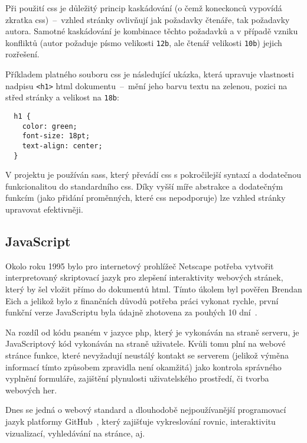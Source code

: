 \documentclass[a4paper, 12pt]{article}
\begin{document}
  Při použití \gls{css} je důležitý princip kaskádování (o čemž koneckonců vypovídá zkratka \gls{css})~--~vzhled stránky ovlivňují jak požadavky čtenáře, tak požadavky autora. Samotné kaskádování je kombinace těchto požadavků a v případě vzniku konfliktů (autor požaduje písmo velikosti \texttt{12b}, ale čtenář velikosti \texttt{10b}) jejich rozřešení.

  Příkladem platného souboru \gls{css} je následující ukázka, která upravuje vlastnosti nadpisu \texttt{<h1>} \gls{html} dokumentu~--~mění jeho barvu textu na zelenou, pozici na střed stránky a velikost na \texttt{18b}:

  \begin{verbatim}
  h1 {
    color: green;
    font-size: 18pt;
    text-align: center;
  }
  \end{verbatim}

  V projektu je používán \gls{sass}, který převádí \gls{css} s pokročilejší syntaxí a dodatečnou funkcionalitou do standardního \gls{css}. Díky vyšší míře abstrakce a dodatečným funkcím (jako přidání proměnných, které \gls{css} nepodporuje) lze vzhled stránky upravovat efektivněji.


  \subsection{JavaScript} \label{sec:JavaScript}
  Okolo roku 1995 bylo pro internetový prohlížeč Netscape potřeba vytvořit interpretovaný skriptovací jazyk pro zlepšení interaktivity webových stránek, který by šel vložit přímo do dokumentů \gls{html}. Tímto úkolem byl pověřen Brendan Eich a jelikož bylo z finančních důvodů potřeba práci vykonat rychle, první funkční verze JavaScriptu byla údajně zhotovena za pouhých 10 dní~\cite{the-origin-of-javascript}.

  Na rozdíl od kódu psaném v jazyce \gls{php}, který je vykonáván na straně serveru, je JavaScriptový kód vykonáván na straně uživatele. Kvůli tomu plní na webové stránce funkce, které nevyžadují neustálý kontakt se serverem (jelikož výměna informací tímto způsobem zpravidla není okamžitá) jako kontrola správného vyplnění formuláře, zajištění plynulosti uživatelského prostředí, či tvorba webových her.

  Dnes se jedná o webový standard a dlouhodobě nejpoužívanější programovací jazyk platformy GitHub~\cite{github-statistics}, který zajišťuje vykreslování rovnic, interaktivitu vizualizací, vyhledávání na stránce, aj.
\end{document}
